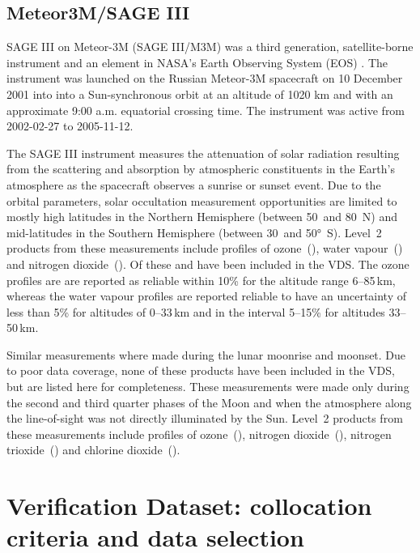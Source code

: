 \subsection{Meteor3M/SAGE III}


SAGE III on Meteor-3M (SAGE III/M3M) was a third generation, satellite-borne
instrument and an element in NASA's Earth Observing System (EOS) \citep{SAGEIII_DPUG}. 
The instrument was launched on the Russian Meteor-3M spacecraft on 10 December 2001
into into a Sun-synchronous orbit at an altitude of 1020 km and with an
approximate 9:00 a.m. equatorial crossing time.  The instrument was active from
2002-02-27 to 2005-11-12.

The SAGE III instrument measures the attenuation of solar radiation resulting
from the scattering and absorption by atmospheric constituents in the Earth’s
atmosphere as the spacecraft observes a sunrise or sunset event.  Due to the
orbital parameters, solar occultation measurement opportunities are limited to
mostly high latitudes in the Northern Hemisphere (between 50\degree~and
80\degree~N) and mid-latitudes in the Southern Hemisphere (between
30\degree~and 50°~S).  Level~2 products from these measurements include
profiles of ozone~(), water vapour~() and nitrogen
dioxide~().  Of these  and  have been included
in the VDS.  The ozone profiles are are reported as reliable within 10\% for
the altitude range 6--85\,km, whereas the water vapour profiles are reported
reliable to have an uncertainty of less than 5\% for altitudes of 0--33\,km and
in the interval 5--15\% for altitudes 33--50\,km.

Similar measurements where made during the lunar moonrise and moonset. Due to
poor data coverage, none of these products have been included in the VDS, but
are listed here for completeness.  These measurements were made only during the
second and third quarter phases of the Moon and when the atmosphere along the
line-of-sight was not directly illuminated by the Sun.  Level~2 products from
these measurements include profiles of ozone~(), nitrogen
dioxide~(), nitrogen trioxide~() and chlorine
dioxide~().


\section{Verification Dataset: collocation criteria and data selection}
\label{sec:vdsselection}

